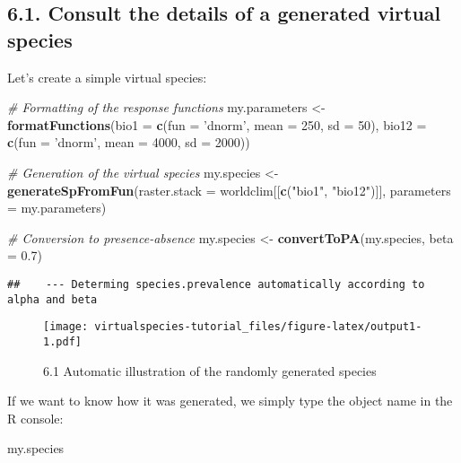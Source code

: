 \documentclass[]{article}
\newenvironment{Shaded}{\begin{snugshade}}{\end{snugshade}}
\newcommand{\KeywordTok}[1]{\textcolor[rgb]{0.13,0.29,0.53}{\textbf{#1}}}
\newcommand{\DataTypeTok}[1]{\textcolor[rgb]{0.13,0.29,0.53}{#1}}
\newcommand{\DecValTok}[1]{\textcolor[rgb]{0.00,0.00,0.81}{#1}}
\newcommand{\FloatTok}[1]{\textcolor[rgb]{0.00,0.00,0.81}{#1}}
\newcommand{\StringTok}[1]{\textcolor[rgb]{0.31,0.60,0.02}{#1}}
\newcommand{\CommentTok}[1]{\textcolor[rgb]{0.56,0.35,0.01}{\textit{#1}}}
\newcommand{\NormalTok}[1]{#1}
\begin{document}
\subsection{6.1. Consult the details of a generated virtual
species}\label{consult-the-details-of-a-generated-virtual-species}

Let's create a simple virtual species:

\begin{Shaded}
\begin{Highlighting}[]
\CommentTok{# Formatting of the response functions}
\NormalTok{my.parameters <-}\StringTok{ }\KeywordTok{formatFunctions}\NormalTok{(}\DataTypeTok{bio1 =} \KeywordTok{c}\NormalTok{(}\DataTypeTok{fun =} \StringTok{'dnorm'}\NormalTok{, }\DataTypeTok{mean =} \DecValTok{250}\NormalTok{, }\DataTypeTok{sd =} \DecValTok{50}\NormalTok{),}
                                 \DataTypeTok{bio12 =} \KeywordTok{c}\NormalTok{(}\DataTypeTok{fun =} \StringTok{'dnorm'}\NormalTok{, }\DataTypeTok{mean =} \DecValTok{4000}\NormalTok{, }\DataTypeTok{sd =} \DecValTok{2000}\NormalTok{))}

\CommentTok{# Generation of the virtual species}
\NormalTok{my.species <-}\StringTok{ }\KeywordTok{generateSpFromFun}\NormalTok{(}\DataTypeTok{raster.stack =}\NormalTok{ worldclim[[}\KeywordTok{c}\NormalTok{(}\StringTok{"bio1"}\NormalTok{, }\StringTok{"bio12"}\NormalTok{)]],}
                                \DataTypeTok{parameters =}\NormalTok{ my.parameters)}

\CommentTok{# Conversion to presence-absence}
\NormalTok{my.species <-}\StringTok{ }\KeywordTok{convertToPA}\NormalTok{(my.species,}
                          \DataTypeTok{beta =} \FloatTok{0.7}\NormalTok{)}
\end{Highlighting}
\end{Shaded}

\begin{verbatim}
##    --- Determing species.prevalence automatically according to alpha and beta
\end{verbatim}

\begin{figure}
\centering
\texttt{[image: virtualspecies-tutorial\_files/figure-latex/output1-1.pdf]}
\caption{6.1 Automatic illustration of the randomly generated species}
\end{figure}

If we want to know how it was generated, we simply type the object name
in the R console:

\begin{Shaded}
\begin{Highlighting}[]
\NormalTok{my.species}
\end{Highlighting}
\end{Shaded}
\end{document}
